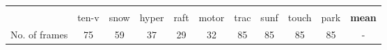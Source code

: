 \documentclass[final]{cvpr}
\begin{document}
\begin{table*}[ht]
    \centering
    \footnotesize{
    \begin{tabular}{lcccccccccc}
        \toprule
        
        \multicolumn{1}{l}{\phantom} &
        \multicolumn{10}{c}{} \\
        \cmidrule(lr){2-11}
        &
        \multicolumn{1}{c}{ten-v} &
        \multicolumn{1}{c}{snow} & 
        \multicolumn{1}{c}{hyper} & 
        \multicolumn{1}{c}{raft} &
        \multicolumn{1}{c}{motor} &
        \multicolumn{1}{c}{trac} &
        \multicolumn{1}{c}{sunf} &
        \multicolumn{1}{c}{touch} &
        \multicolumn{1}{c}{park} &
        \multicolumn{1}{c}{\textbf{mean}} \\
        
        \midrule
        No. of frames &
        \multicolumn{1}{c}{75} &
        \multicolumn{1}{c}{59} &
        \multicolumn{1}{c}{37} & 
        \multicolumn{1}{c}{29} &
        \multicolumn{1}{c}{32} &
        \multicolumn{1}{c}{85} &
        \multicolumn{1}{c}{85} &
        \multicolumn{1}{c}{85} &
        \multicolumn{1}{c}{85} &
        \multicolumn{1}{c}{-} \\
        
        \midrule
        

\end{tabular}}
\end{table*}
\end{document}
